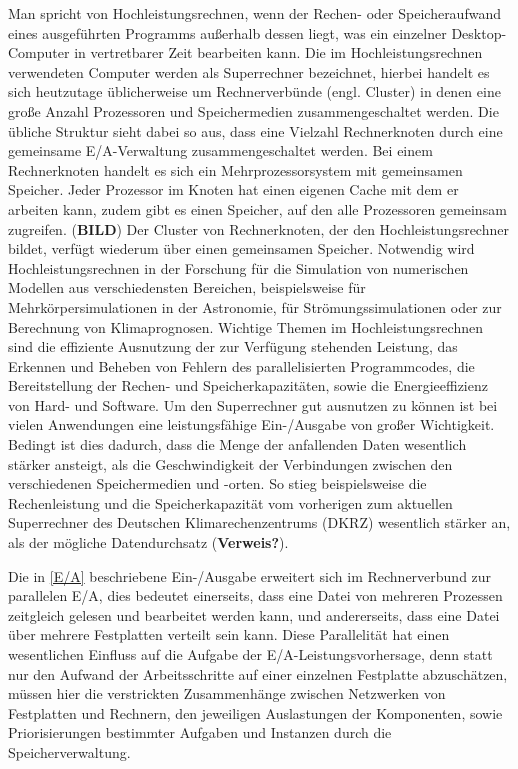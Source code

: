 \documentclass[
	12pt,
	a4paper,
	BCOR10mm,
	DIV14,
	listof=totoc,
	bibliography=totoc,
	headsepline
]{scrreprt}
\begin{document}
Man spricht von Hochleistungsrechnen, wenn der Rechen- oder Speicheraufwand eines ausgeführten Programms außerhalb dessen liegt, was ein einzelner Desktop-Computer in vertretbarer Zeit bearbeiten kann.
Die im Hochleistungsrechnen verwendeten Computer werden als Superrechner bezeichnet, hierbei handelt es sich heutzutage üblicherweise um Rechnerverbünde (engl. Cluster) in denen eine große Anzahl Prozessoren und Speichermedien zusammengeschaltet werden.
Die übliche Struktur sieht dabei so aus, dass eine Vielzahl Rechnerknoten durch eine gemeinsame E/A-Verwaltung zusammengeschaltet werden. Bei einem Rechnerknoten handelt es sich ein Mehrprozessorsystem mit gemeinsamen Speicher. Jeder Prozessor im Knoten hat einen eigenen Cache mit dem er arbeiten kann, zudem gibt es einen Speicher, auf den alle Prozessoren gemeinsam zugreifen. (\textbf{BILD})
Der Cluster von Rechnerknoten, der den Hochleistungsrechner bildet, verfügt wiederum über einen gemeinsamen Speicher.
Notwendig wird Hochleistungsrechnen in der Forschung für die Simulation von numerischen Modellen aus verschiedensten Bereichen, beispielsweise für Mehrkörpersimulationen in der Astronomie, für Strömungssimulationen oder zur Berechnung von Klimaprognosen.
Wichtige Themen im Hochleistungsrechnen sind die effiziente Ausnutzung der zur Verfügung stehenden Leistung, das Erkennen und Beheben von Fehlern des parallelisierten Programmcodes, die Bereitstellung der Rechen- und Speicherkapazitäten, sowie die Energieeffizienz von Hard- und Software.
Um den Superrechner gut ausnutzen zu können ist bei vielen Anwendungen eine leistungsfähige Ein-/Ausgabe von großer Wichtigkeit. Bedingt ist dies dadurch, dass die Menge der anfallenden Daten wesentlich stärker ansteigt, als die Geschwindigkeit der Verbindungen zwischen den verschiedenen Speichermedien und -orten. So stieg beispielsweise die Rechenleistung und die Speicherkapazität vom vorherigen zum aktuellen Superrechner des Deutschen Klimarechenzentrums (DKRZ) wesentlich stärker an, als der mögliche Datendurchsatz (\textbf{Verweis?}).

Die in \ref{E/A} beschriebene Ein-/Ausgabe erweitert sich im Rechnerverbund zur parallelen E/A, dies bedeutet einerseits, dass eine Datei von mehreren Prozessen zeitgleich gelesen und bearbeitet werden kann, und andererseits, dass eine Datei über mehrere Festplatten verteilt sein kann. Diese Parallelität hat einen wesentlichen Einfluss auf die Aufgabe der E/A-Leistungsvorhersage, denn statt nur den Aufwand der Arbeitsschritte auf einer einzelnen Festplatte abzuschätzen, müssen hier die verstrickten Zusammenhänge zwischen Netzwerken von Festplatten und Rechnern, den jeweiligen Auslastungen der Komponenten, sowie Priorisierungen bestimmter Aufgaben und Instanzen durch die Speicherverwaltung.
\end{document}
